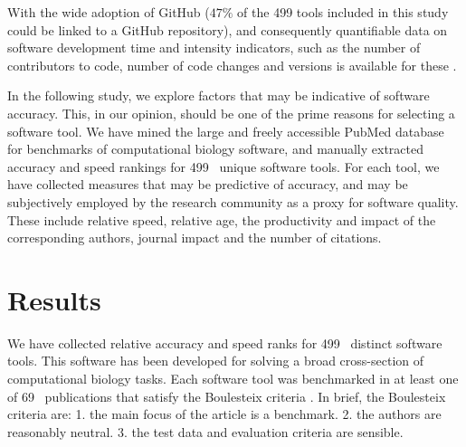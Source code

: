 \documentclass{bmcart}
\def\numTools{499}
\def\numBenchmarkPubs{69}
\begin{document}
With the wide adoption of GitHub ($47\%$ of the
{\color{black}\numTools} tools included in this study could be
linked to a GitHub repository), and consequently quantifiable data on software
development time and intensity indicators, such as the number of contributors to code, number of code
changes and versions is available for these
\cite{ray2014large,Dozmorov:2018,Mangul:2019}.

In the following study, we explore factors that may be indicative of
software accuracy. This, in our opinion, should be one of the prime
reasons for selecting a software tool. We have mined the large and
freely accessible PubMed database \cite{Sayers2010-vm} for benchmarks
of computational biology software, and manually extracted accuracy and
speed rankings for {\color{black}\numTools~} unique software tools. For
each tool, we have collected measures that may be predictive
of accuracy, and may be subjectively employed by the research
community as a proxy for software quality. These include relative
speed, relative age, the productivity and impact of the corresponding
authors, journal impact and the number of citations.

\section*{Results}
We have collected relative accuracy and speed ranks for
{\color{black}\numTools~} distinct software tools. This software has
been developed for solving a broad cross-section of computational biology
tasks.
Each software tool was benchmarked in at least one of
{\color{black}\numBenchmarkPubs~} publications that satisfy the Boulesteix
criteria \cite{Boulesteix2013-vb}. In brief, the Boulesteix criteria
are: 1. the main focus of the article is a benchmark. 2. the authors
are reasonably neutral. 3. the test data and evaluation criteria are
sensible.
\end{document}
